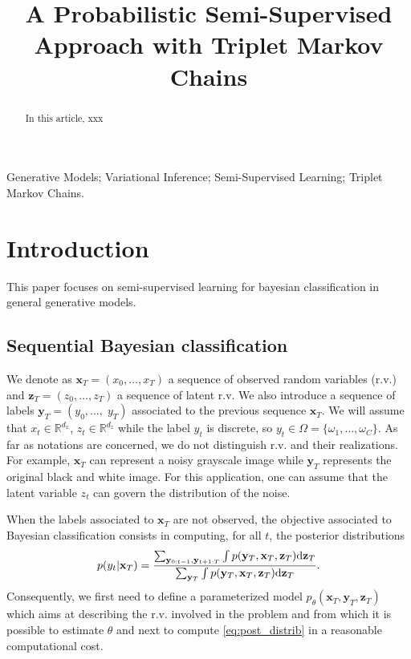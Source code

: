 \documentclass{article}
\title{A Probabilistic Semi-Supervised Approach with Triplet Markov Chains}
\def\x{{\mathbf x}}
\def\z{{\mathbf z}}
\def\y{{\mathbf y}}
\def\p{p_{\theta}}
\begin{document}

\maketitle

\begin{abstract}
In this article, xxx
\end{abstract}
%
\begin{keywords}
Generative Models; Variational Inference; Semi-Supervised Learning; Triplet Markov Chains.
\end{keywords}
%
\section{Introduction}
\label{sec:intro}
This paper focuses on semi-supervised 
learning for bayesian classification 
in general generative models.

\subsection{Sequential Bayesian classification}
 We denote as $\x_T=(x_{0}, \dots, x_{T})$
a sequence of observed random variables (r.v.) and $\z_T=(z_{0}, \dots, z_{T})$ a sequence of latent r.v. We also introduce a sequence
of labels $\y_T=(y_{0}, \dots,\; y_{T})$ associated to the previous sequence $\x_T$. We will assume that  $x_t \in \mathbb{R}^{d_x}$, $z_t \in \mathbb{R}^{d_z}$ while the label
$y_t$ is discrete, so  $y_t \in \Omega=\{\omega_1,\dots,\omega_C\}$.
As far as notations are concerned, we do not distinguish r.v. and their realizations.
For example, $\x_T$ can represent a noisy grayscale image while $\y_T$ represents the original black and white image. For this application, one can assume that the latent variable $z_t$ can govern the distribution of the noise.

When the labels associated to $\x_T$
are not observed, the objective associated to Bayesian classification consists in computing, for all $t$, the posterior distributions 
\begin{equation}
\label{eq:post_distrib}
p(y_t|\x_T)= %
\frac{\sum_{\y_{0:t-1},\y_{t+1:T}} \int p(\y_T,\x_T,\z_T) {\rm d}\z_T  } {\sum_{\y_T} \int p(\y_T,\x_T,\z_T) {\rm d}\z_T} \text{.}
\end{equation}
Consequently, we 
first need to define a parameterized model $\p(\x_T,\y_T,\z_T)$ which aims
at describing the r.v. involved in the
problem and from which 
it is possible to estimate 
$\theta$ and next to compute \eqref{eq:post_distrib} in a reasonable computational cost. 
\end{document}
